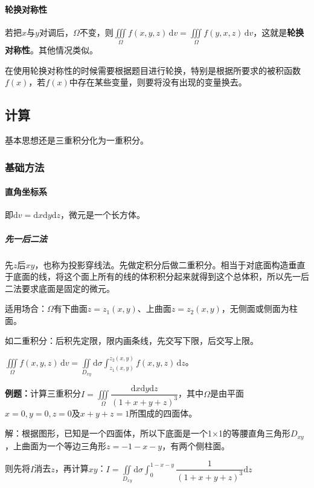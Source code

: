 \documentclass[UTF8, 12pt]{ctexart}
\begin{document}
\paragraph{轮换对称性} \leavevmode \medskip

若把$x$与$y$对调后，$\Omega$不变，则$\iiint\limits_\Omega f(x,y,z)\,\textrm{d}v=\iiint\limits_\Omega f(y,x,z)\,\textrm{d}v$，这就是\textbf{轮换对称性}。其他情况类似。

在使用轮换对称性的时候需要根据题目进行轮换，特别是根据所要求的被积函数$f(x)$，若$f(x)$中存在某些变量，则要将没有出现的变量换去。

\subsection{计算}

基本思想还是三重积分化为一重积分。

\subsubsection{基础方法}

\paragraph{直角坐标系} \leavevmode \medskip

即$\textrm{d}v=\textrm{d}x\textrm{d}y\textrm{d}z$，微元是一个长方体。

\subparagraph{先一后二法} \leavevmode \medskip

先$z$后$xy$，也称为投影穿线法。先做定积分后做二重积分。相当于对底面构造垂直于底面的线，将这个面上所有的线的体积积分起来就得到这个总体积，所以先一后二法要求底面是固定的微元。

适用场合：$\Omega$有下曲面$z=z_1(x,y)$、上曲面$z=z_2(x,y)$，无侧面或侧面为柱面。

如二重积分：后积先定限，限内画条线，先交写下限，后交写上限。

$\iiint\limits_\Omega f(x,y,z)\,\textrm{d}v=\iint\limits_{D_{xy}}\textrm{d}\sigma\int_{z_1(x,y)}^{z_2(x,y)}f(x,y,z)\,\textrm{d}z$。

\textbf{例题：}计算三重积分$I=\displaystyle{\iiint\limits_\Omega\dfrac{\textrm{d}x\textrm{d}y\textrm{d}z}{(1+x+y+z)^3}}$，其中$\Omega$是由平面$x=0,y=0,z=0$及$x+y+z=1$所围成的四面体。

解：根据图形，已知是一个四面体，所以下底面是一个1×1的等腰直角三角形$D_{xy}$，上曲面为一个等边三角形$z=-1-x-y$，有两个侧柱面。

则先将$I$消去$z$，再计算$xy$：$I=\displaystyle{\iint\limits_{D_{xy}}\textrm{d}\sigma\int_0^{1-x-y}\dfrac{1}{(1+x+y+z)^3}\textrm{d}z}$
\end{document}
